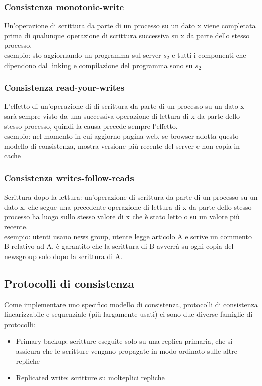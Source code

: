 \documentclass{article}
\begin{document}
\subsubsection{Consistenza monotonic-write}
Un'operazione di scrittura da parte di un processo su un dato x viene completata prima di qualunque operazione di scrittura successiva su x da parte dello stesso processo.\\ esempio: sto aggiornando un programma sul server $s_2$ e tutti i componenti che dipendono dal linking e compilazione del programma sono su $s_2$
\subsubsection{Consistenza read-your-writes}
L'effetto di un'operazione di di scrittura da parte di un processo su un dato x sarà sempre visto da una successiva operazione di lettura di x da parte dello stesso processo, quindi la causa precede sempre l'effetto.\\ esempio: nel momento in cui aggiorno pagina web, se browser adotta questo modello di consistenza, mostra versione più recente del server e non copia in cache
\subsubsection{Consistenza writes-follow-reads}
Scrittura dopo la lettura: un'operazione di scrittura da parte di un processo su un dato x, che segue una precedente operazione di lettura di x da parte dello stesso processo ha luogo sullo stesso valore di x che è stato letto o su un valore più recente.\\ esempio: utenti usano news group, utente legge articolo A e scrive un commento B relativo ad A, è garantito che la scrittura di B avverrà su ogni copia del newsgroup solo dopo la scrittura di A.
\subsection{Protocolli di consistenza}
Come implementare uno specifico modello di consistenza, protocolli di consistenza linearizzabile e sequenziale (più largamente usati) ci sono due diverse famiglie di protocolli:
\begin{itemize}
\item Primary backup: scritture eseguite solo su una replica primaria, che si assicura che le scritture vengano propagate in modo ordinato sulle altre repliche
\item Replicated write: scritture su molteplici repliche
\end{itemize}
\end{document}

